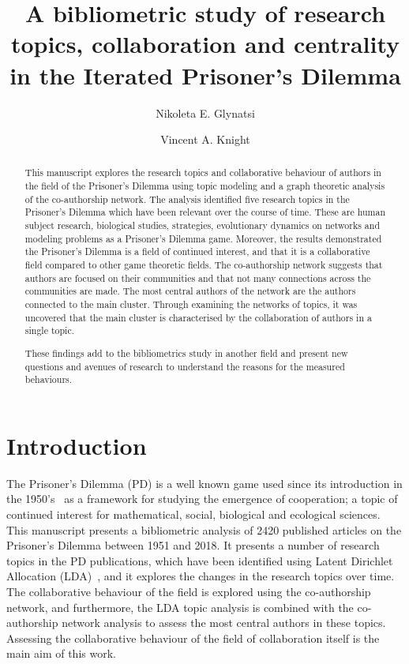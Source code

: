 \documentclass{article}
\title{A bibliometric study of research topics, collaboration and centrality 
       in the Iterated Prisoner's Dilemma}
\author[1, 2, *]{Nikoleta E. Glynatsi}
\author[1]{Vincent A. Knight}
\affil[1]{Cardiff University, School of Mathematics, United Kingdom}
\affil[2]{Max Planck Institute for Evolutionary Biology, Germany}
\affil[*]{Corresponding author: Nikoleta E. Glynatsi, glynatsi@evolbio.mpg.de}
\date{}
\theoremstyle{definition}
\begin{document}
\maketitle

\begin{abstract}
This manuscript explores the research topics and collaborative behaviour of
authors in the field of the Prisoner's Dilemma using topic modeling and a graph
theoretic analysis of the co-authorship network. The analysis identified five
research topics in the Prisoner's Dilemma which have been relevant over the course
of time. These are human subject research, biological studies, strategies,
evolutionary dynamics on networks and modeling problems as a Prisoner's Dilemma
game. Moreover, the results demonstrated the Prisoner's Dilemma is a field of
continued interest, and that it is a collaborative field compared to other
game theoretic fields. The co-authorship
network suggests that authors are focused on their communities and that not many
connections across the communities are made. The most central authors of the network
are the authors connected to the main cluster. Through examining the networks
of topics, it was uncovered that the main cluster is characterised by the
collaboration of authors in a single topic.

These findings add to the bibliometrics study in another field and present new questions 
and avenues of research to understand the reasons for the measured behaviours.
\end{abstract}

\section{Introduction}\label{section:introduction}

The Prisoner's Dilemma (PD) is a well known game used since its introduction in
the 1950's~\cite{Flood1958} as a framework for studying the emergence of
cooperation; a topic of continued interest for mathematical,
social, biological and
ecological sciences. This manuscript presents a bibliometric
analysis of 2420 published articles on the Prisoner's Dilemma between 1951 and
2018. It presents a number of research topics in the PD publications, which have been
identified using Latent Dirichlet Allocation (LDA)~\cite{Blei2003}, and it explores the changes in the
research topics over time. The collaborative behaviour of the field is explored
using the co-authorship network, and furthermore, the LDA
topic analysis is combined with the co-authorship network analysis to assess
the most central authors in these topics. Assessing the collaborative
behaviour of the field of collaboration itself is the main aim of this work.
\end{document}
